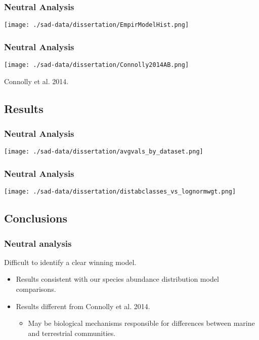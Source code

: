\documentclass[14pt]{beamer}
\begin{document}
\begin{frame}{}
\frametitle{Neutral Analysis}
\texttt{[image: ./sad-data/dissertation/EmpirModelHist.png]}
\end{frame}

\begin{frame}{}
\frametitle{Neutral Analysis}
\texttt{[image: ./sad-data/dissertation/Connolly2014AB.png]}
\begin{tiny}
Connolly et al. 2014.
\end{tiny}
\end{frame}


\subsection{Results}
\begin{frame}{}
\frametitle{Neutral Analysis}
\texttt{[image: ./sad-data/dissertation/avgvals\_by\_dataset.png]}
\end{frame}

\begin{frame}{}
\frametitle{Neutral Analysis}
\texttt{[image: ./sad-data/dissertation/distabclasses\_vs\_lognormwgt.png]}
\end{frame}

\subsection{Conclusions}
\begin{frame}
\frametitle{Neutral analysis}
Difficult to identify a clear winning model.
\begin{itemize}
\item Results consistent with our species abundance distribution model comparisons. 
\item Results different from Connolly et al. 2014.
\begin{itemize}
\item May be biological mechanisms responsible for differences between marine and terrestrial communities.
\end{itemize}
\end{itemize}
\end{frame}
\end{document}
